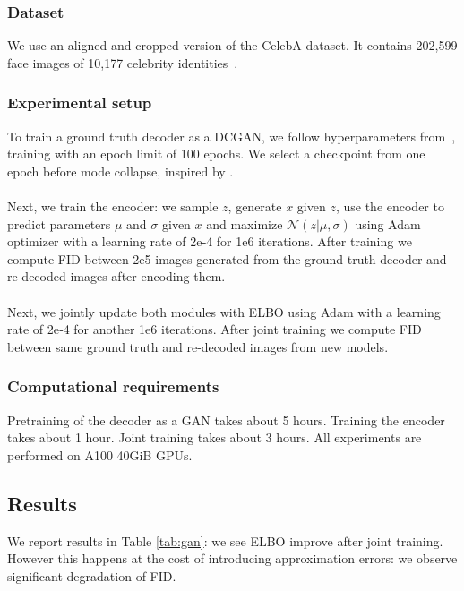 \subsubsection{Dataset}
We use an aligned and cropped version of the CelebA dataset. It contains 202,599 face images of 10,177 celebrity identities~\cite{liu2015faceattributes}.

\subsubsection{Experimental setup}
To train a ground truth decoder as a DCGAN, we follow hyperparameters from~\cite{Inkawhich}, training with an epoch limit of 100 epochs. We select a checkpoint from one epoch before mode collapse, inspired by \cite{brock2019large}.

\paragraph{} Next, we train the encoder: we sample $z$, generate $x$ given $z$, use the encoder to predict parameters $\mu$ and $\sigma$ given $x$ and maximize $\mathcal{N}(z | \mu, \sigma)$ using Adam optimizer with a learning rate of 2e‐4 for 1e6 iterations. After training we compute FID between 2e5 images generated from the ground truth decoder and re-decoded images after encoding them.

\paragraph{} Next, we jointly update both modules with ELBO using Adam with a learning rate of 2e‐4 for another 1e6 iterations. After joint training we compute FID between same ground truth and re-decoded images from new models.

\subsubsection{Computational requirements}
Pretraining of the decoder as a GAN takes about 5 hours. Training the encoder takes about 1 hour. Joint training takes about 3 hours. All experiments are performed on A100 40GiB GPUs.

\subsection{Results}
We report results in Table \ref{tab:gan}: we see ELBO improve after joint training. However this happens at the cost of introducing approximation errors: we observe significant degradation of FID.

